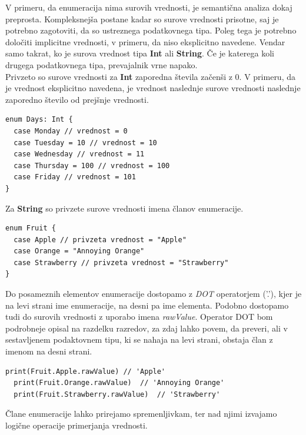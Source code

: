 \documentclass[a4paper, 12pt]{book}
\begin{document}
V primeru, da enumeracija nima surovih vrednosti, je semantična analiza dokaj preprosta. Kompleksnejša postane kadar so surove vrednosti prisotne, saj je potrebno zagotoviti, da so ustreznega podatkovnega tipa. Poleg tega je potrebno določiti implicitne vrednosti, v primeru, da niso eksplicitno navedene. Vendar samo takrat, ko je surova vrednost tipa \textbf{Int} ali \textbf{String}. Če je katerega koli drugega podatkovnega tipa, prevajalnik vrne napako. \\
\indent Privzeto so surove vrednosti za \textbf{Int} zaporedna števila začenši z 0. V primeru, da je vrednost eksplicitno navedena, je vrednost naslednje surove vrednosti naslednje zaporedno število od prejšnje vrednosti.

\begin{lstlisting}[caption={Enumeracija s surovimi vrednostmi tipa Int}, captionpos=b]
enum Days: Int {
  case Monday // vrednost = 0
  case Tuesday = 10 // vrednost = 10
  case Wednesday // vrednost = 11
  case Thursday = 100 // vrednost = 100
  case Friday // vrednost = 101
}
\end{lstlisting}

\indent Za \textbf{String} so privzete surove vrednosti imena članov enumeracije.

\begin{lstlisting}[caption={Enumeracija s surovimi vrednostmi tipa String}, captionpos=b, label={lst:fruitEnumeration}]
enum Fruit {
  case Apple // privzeta vrednost = "Apple"
  case Orange = "Annoying Orange"
  case Strawberry // privzeta vrednost = "Strawberry"
}
\end{lstlisting}

Do posameznih elementov enumeracije dostopamo z \textit{DOT} operatorjem ('.'), kjer je na levi strani ime enumeracije, na desni pa ime elementa. Podobno dostopamo tudi do surovih vrednosti z uporabo imena \textit{rawValue}. Operator DOT bom podrobneje opisal na razdelku razredov, za zdaj lahko povem, da preveri, ali v sestavljenem podaktovnem tipu, ki se nahaja na levi strani, obstaja član z imenom na desni strani.

\begin{lstlisting}[caption={Primer dostopa do elementov enumeracije ~\ref{lst:fruitEnumeration}}, captionpos=b]
  print(Fruit.Apple.rawValue) // 'Apple'
  print(Fruit.Orange.rawValue)  // 'Annoying Orange'
  print(Fruit.Strawberry.rawValue)  // 'Strawberry'
\end{lstlisting}

Člane enumeracije lahko prirejamo spremenljivkam, ter nad njimi izvajamo logične operacije primerjanja vrednosti. 
\end{document}
